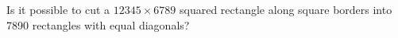 \problem
Is it possible to cut a $12345 \times 6789$ squared rectangle along square borders into 7890 rectangles with equal diagonals?
\solution
\endproblem
